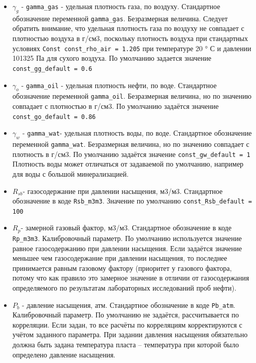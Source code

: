 \documentclass[]{scrreprt}
\begin{document}
\begin{itemize}
	
\item	$\gamma_g$  - \texttt{gamma_gas} - удельная плотность газа, по воздуху. Стандартное обозначение переменной \texttt{gamma_gas}. Безразмерная величина. Следует обратить внимание, что удельная плотность газа по воздуху не совпадает с плотностью воздуха в г/см3, поскольку плотность воздуха при стандартных условиях \texttt{Const const_rho_air = 1.205} при температуре 20 ° \textdegree С и давлении 101325 Па для сухого воздуха. По умолчанию задается значение \texttt{const_gg_default = 0.6}

\item $\gamma_o$  - \texttt{gamma_oil} - удельная плотность нефти, по воде. Стандартное обозначение переменной \texttt{gamma_oil}. Безразмерная величина, но по значению совпадает с плотностью в г/см3. По умолчанию задаётся значение \texttt{const_go_default = 0.86}

\item $\gamma_w$  - \texttt{gamma_wat}- удельная плотность воды, по воде. Стандартное обозначение переменной \texttt{gamma_wat}. Безразмерная величина, но по значению совпадает с плотность в г/см3. По умолчанию задаётся значение \texttt{const_gw_default = 1} Плотность воды может отличаться от задаваемой по умолчанию, например для воды с большой минерализацией.  

\item $R_{sb}$- газосодержание при давлении насыщения, м3/м3. Стандартное обозначение в коде \texttt{Rsb_m3m3}. Значение по умолчанию \texttt{const_Rsb_default = 100}

\item $R_p$-  замерной газовый фактор, м3/м3. Стандартное обозначение в коде \texttt{Rp_m3m3}. Калибровочный параметр. По умолчанию используется значение равное газосодержанию при давлении насыщения. Если задаётся значение меньшее чем газосодержание при давлении насыщения, то последнее принимается равным газовому фактору (приоритет у газового фактора, потому что как правило это замерное значение в отличии от газосодержания определяемого по результатам лабораторных исследований проб нефти).

\item $P_b$ - давление насыщения, атм. Стандартное обозначение в коде \texttt{Pb_atm}. Калибровочный параметр. По умолчанию не задаётся, рассчитывается по корреляции. Если задан, то все расчёты по корреляциям корректируются с учётом заданного параметра. При задании давления насыщения обязательно должна быть задана температура пласта – температура при которой было определено давление насыщения. 


\end{itemize}
\end{document}

